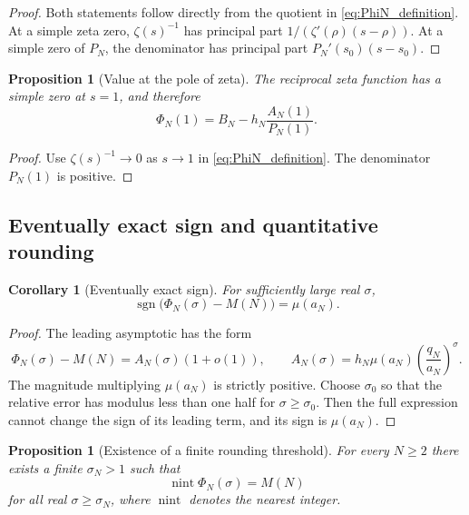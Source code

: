 \documentclass[11pt]{amsart}
\numberwithin{equation}{section}
\theoremstyle{plain}
\newtheorem{proposition}[theorem]{Proposition}
\newtheorem{corollary}[theorem]{Corollary}
\theoremstyle{definition}
\theoremstyle{remark}
\newcommand{\1}{\mathbf{1}}
\begin{document}
\begin{proof}
Both statements follow directly from the quotient in
\eqref{eq:PhiN_definition}.  At a simple zeta zero,
$\zeta(s)^{-1}$ has principal part
$1/(\zeta'(\rho)(s-\rho))$.  At a simple zero of $P_N$, the denominator has
principal part $P_N'(s_0)(s-s_0)$.
\end{proof}

\begin{proposition}[Value at the pole of zeta]
\label{prop:Phi_at_one}
The reciprocal zeta function has a simple zero at $s=1$, and therefore
\begin{equation}
\Phi_N(1)
=
B_N-h_N\frac{A_N(1)}{P_N(1)}.
\label{eq:Phi_at_one}
\end{equation}
\end{proposition}

\begin{proof}
Use $\zeta(s)^{-1}\to0$ as $s\to1$ in
\eqref{eq:PhiN_definition}.  The denominator $P_N(1)$ is positive.
\end{proof}

\subsection{Eventually exact sign and quantitative rounding}
\label{subsec:eventual_sign_rounding}

\begin{corollary}[Eventually exact sign]
\label{cor:eventual_sign}
For sufficiently large real $\sigma$,
\begin{equation}
\operatorname{sgn}\bigl(\Phi_N(\sigma)-M(N)\bigr)
=
\mu(a_N).
\label{eq:eventual_sign}
\end{equation}
\end{corollary}

\begin{proof}
The leading asymptotic has the form
\begin{equation}
\Phi_N(\sigma)-M(N)
=
A_N(\sigma)(1+o(1)),
\qquad
A_N(\sigma)
=
h_N\mu(a_N)\left(\frac{q_N}{a_N}\right)^\sigma.
\label{eq:eventual_sign_leading_term}
\end{equation}
The magnitude multiplying \(\mu(a_N)\) is strictly positive.  Choose
\(\sigma_0\) so that the relative error has modulus less than one half for
\(\sigma\geq\sigma_0\).  Then the full expression cannot change the sign
of its leading term, and its sign is \(\mu(a_N)\).
\end{proof}

\begin{proposition}[Existence of a finite rounding threshold]
\label{prop:finite_rounding_threshold}
For every $N\geq2$ there exists a finite $\sigma_N>1$ such that
\begin{equation}
\operatorname{nint}\Phi_N(\sigma)=M(N)
\label{eq:eventual_rounding}
\end{equation}
for all real $\sigma\geq\sigma_N$, where $\operatorname{nint}$ denotes the
nearest integer.
\end{proposition}
\end{document}
